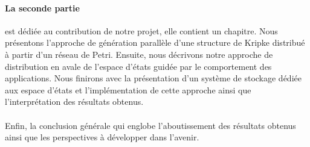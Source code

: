 \paragraph{La seconde partie} est dédiée au contribution de notre projet, elle contient un chapitre.
 Nous présentons l'approche de génération parallèle d'une structure de Kripke distribué à partir d'un réseau de Petri. Ensuite, nous décrivons notre approche de distribution en avale de l'espace d'états guidée par le comportement des applications. Nous finirons avec la présentation d'un système de stockage dédiée aux espace d'états et l’implémentation de cette approche ainsi que l’interprétation des résultats obtenus.
 \\\\
 
 
Enfin, la conclusion générale qui englobe l’aboutissement des résultats obtenus  ainsi que les perspectives à développer dans l’avenir.  

